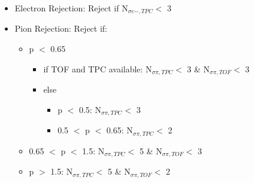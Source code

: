 \documentclass[../AnalysisNoteJBuxton.tex]{subfiles}
\begin{document}
\begin{itemize}
\begin{itemize}
  \end{itemize}
 \item Electron Rejection: Reject if N$_{\sigma e-,TPC} < $ 3
 \item Pion Rejection:  Reject if: 
  \begin{itemize}
  \itemsep0em
  \item p $<$ 0.65
   \begin{itemize}
   \itemsep0em
   \item if TOF and TPC available: N$_{\sigma \pi,TPC} <$ 3 \& N$_{\sigma \pi,TOF} <$ 3
   \item else
    \begin{itemize}
    \itemsep0em
    \item p $<$ 0.5: N$_{\sigma \pi,TPC} <$ 3
    \item 0.5 $<$ p $<$ 0.65: N$_{\sigma \pi,TPC} <$ 2
    \end{itemize}
   \end{itemize}
  \item 0.65 $<$ p $<$ 1.5: N$_{\sigma \pi,TPC} <$ 5 \& N$_{\sigma \pi,TOF} <$ 3
  \item p $>$ 1.5: N$_{\sigma \pi,TPC} <$ 5 \& N$_{\sigma \pi,TOF} <$ 2  
  \end{itemize} 
\end{itemize}
\end{document}

